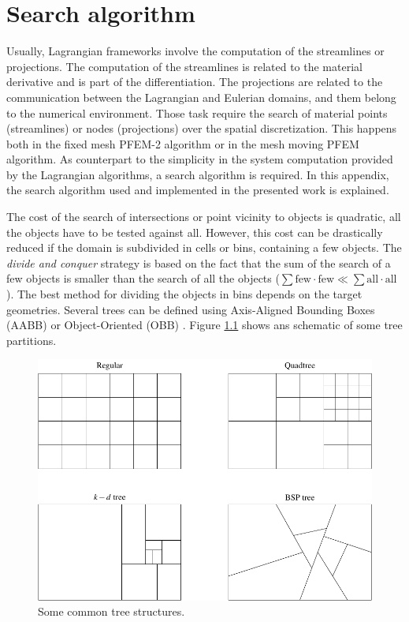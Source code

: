 
\chapter{Search algorithm}
\label{search_algorithm}



Usually, Lagrangian frameworks involve the computation of the streamlines or projections. The computation of the streamlines is related to the material derivative and is part of the differentiation. The projections are related to the communication between the Lagrangian and Eulerian domains, and them belong to the numerical environment. Those task require the search of material points (streamlines) or nodes (projections) over the spatial discretization. This happens both in the fixed mesh PFEM-2 algorithm or in the mesh moving PFEM algorithm. As counterpart to the simplicity in the system computation provided by the Lagrangian algorithms, a search algorithm is required. In this appendix, the search algorithm used and implemented in the presented work is explained.

The cost of the search of intersections or point vicinity to objects is quadratic, all the objects have to be tested against all. However, this cost can be drastically reduced if the domain is subdivided in cells or bins, containing a few objects. 
The \emph{divide and conquer} strategy is based on the fact that the sum of the search of a few objects is smaller than the search of all the objects ($\sum\text{few}\cdot\text{few} \ll \sum\text{all}\cdot\text{all}$). The best method for dividing the objects in bins depends on the target geometries. Several trees can be defined using Axis-Aligned Bounding Boxes (AABB) \cite{samet1984} or Object-Oriented (OBB) \cite{gottschalk1996}. Figure \ref{tree_search} shows ans schematic of some tree partitions.

\begin{figure}[thb]
    \centering
    \includegraphics[width=.9\textwidth]{img/search/tree_search.pdf}
    \caption{Some common tree structures.}
    \label{tree_search}
\end{figure}

